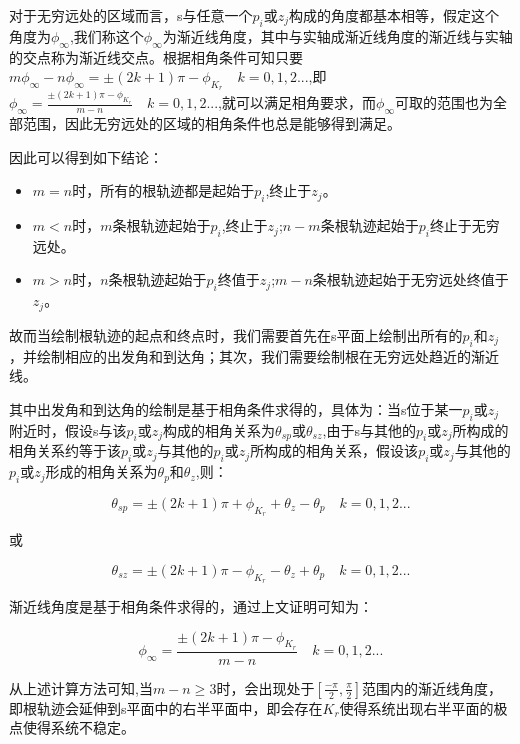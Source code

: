 \documentclass{article}
\numberwithin{equation}{section}
\numberwithin{figure}{section}
\begin{document}
对于无穷远处的区域而言，s与任意一个$p_i$或$z_j$构成的角度都基本相等，假定这个角度为$\phi_\infty$,我们称这个$\phi_\infty$为渐近线角度，其中与实轴成渐近线角度的渐近线与实轴的交点称为渐近线交点。根据相角条件可知只要$m\phi_\infty - n\phi_\infty=±(2k+1)\pi - \phi_{K_r} \quad k=0,1,2...$,即$\phi_\infty = \frac{±(2k+1)\pi - \phi_{K_r}}{m-n} \quad k=0,1,2...$,就可以满足相角要求，而$\phi_\infty$可取的范围也为全部范围，因此无穷远处的区域的相角条件也总是能够得到满足。

因此可以得到如下结论：
\begin{itemize}
    \item $m=n$时，所有的根轨迹都是起始于$p_i$,终止于$z_j$。
    \item $m<n$时，$m$条根轨迹起始于$p_i$,终止于$z_j$;$n-m$条根轨迹起始于$p_i$终止于无穷远处。
    \item $m>n$时，$n$条根轨迹起始于$p_i$终值于$z_j$;$m-n$条根轨迹起始于无穷远处终值于$z_j$。
\end{itemize}

故而当绘制根轨迹的起点和终点时，我们需要首先在s平面上绘制出所有的$p_i$和$z_j$，并绘制相应的出发角和到达角；其次，我们需要绘制根在无穷远处趋近的渐近线。

其中出发角和到达角的绘制是基于相角条件求得的，具体为：当s位于某一$p_i$或$z_j$附近时，假设s与该$p_i$或$z_j$构成的相角关系为$\theta_{sp}$或$\theta_{sz}$,由于s与其他的$p_i$或$z_j$所构成的相角关系约等于该$p_i$或$z_j$与其他的$p_i$或$z_j$所构成的相角关系，假设该$p_i$或$z_j$与其他的$p_i$或$z_j$形成的相角关系为$\theta_p$和$\theta_z$,则：

\begin{equation}
    \theta_{sp}=±(2k+1)\pi + \phi_{K_r} + \theta_z - \theta_p \quad k=0,1,2...
\end{equation}

或

\begin{equation}
    \theta_{sz} = ±(2k+1)\pi - \phi_{K_r} - \theta_z + \theta_p\quad k=0,1,2...
\end{equation}

渐近线角度是基于相角条件求得的，通过上文证明可知为：

\begin{equation}
    \phi_\infty = \frac{±(2k+1)\pi - \phi_{K_r}}{m-n} \quad k=0,1,2...
\end{equation}

从上述计算方法可知,当$m-n≥3$时，会出现处于$[\frac{-\pi}{2},\frac{\pi}{2}]$范围内的渐近线角度，即根轨迹会延伸到s平面中的右半平面中，即会存在$K_r$使得系统出现右半平面的极点使得系统不稳定。
\end{document}
